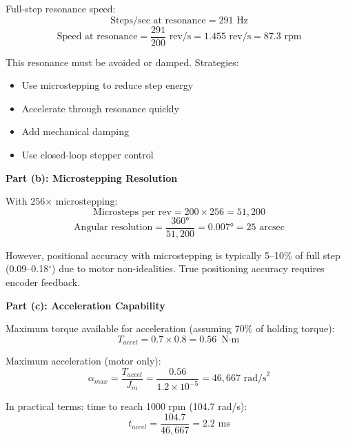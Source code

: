 Full-step resonance speed:
\begin{equation}
    \text{Steps/sec at resonance} = 291 \text{ Hz}
\end{equation}
\begin{equation}
    \text{Speed at resonance} = \frac{291}{200} \text{ rev/s} = 1.455 \text{ rev/s} = 87.3 \text{ rpm}
\end{equation}

This resonance must be avoided or damped. Strategies:
\begin{itemize}
    \item Use microstepping to reduce step energy
    \item Accelerate through resonance quickly
    \item Add mechanical damping
    \item Use closed-loop stepper control
\end{itemize}

\textbf{Part (b): Microstepping Resolution}

With 256$\times$ microstepping:
\begin{equation}
    \text{Microsteps per rev} = 200 \times 256 = 51,200
\end{equation}
\begin{equation}
    \text{Angular resolution} = \frac{360°}{51,200} = 0.007° = 25 \text{ arcsec}
\end{equation}

However, positional accuracy with microstepping is typically 5--10\% of full step (0.09--0.18$^\circ$) due to motor non-idealities. True positioning accuracy requires encoder feedback.

\textbf{Part (c): Acceleration Capability}

Maximum torque available for acceleration (assuming 70\% of holding torque):
\begin{equation}
    T_{accel} = 0.7 \times 0.8 = 0.56 \text{ N$\cdot$m}
\end{equation}

Maximum acceleration (motor only):
\begin{equation}
    \alpha_{max} = \frac{T_{accel}}{J_m} = \frac{0.56}{1.2 \times 10^{-5}} = 46,667 \text{ rad/s}^2
\end{equation}

In practical terms: time to reach 1000 rpm (104.7 rad/s):
\begin{equation}
    t_{accel} = \frac{104.7}{46,667} = 2.2 \text{ ms}
\end{equation}

